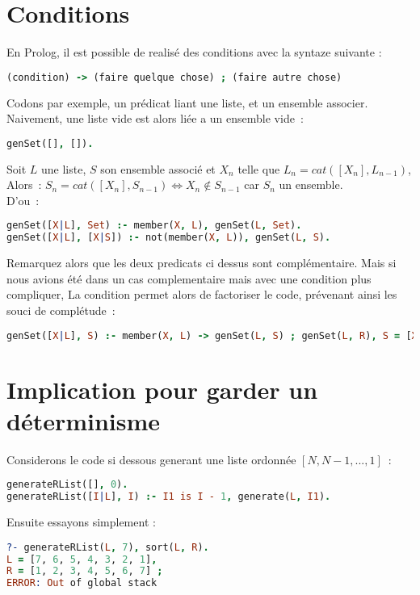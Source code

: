 \section{Conditions}
En Prolog, il est possible de realisé des conditions avec la syntaze suivante :
\begin{lstlisting}[language=Prolog,frame=single]
(condition) -> (faire quelque chose) ; (faire autre chose)
\end{lstlisting}

Codons par exemple, un prédicat liant une liste, et un ensemble associer.
Naivement, une liste vide est alors liée a un ensemble vide~:
\begin{lstlisting}[language=Prolog,frame=single]
genSet([], []).
\end{lstlisting}

Soit $L$ une liste, $S$ son ensemble associé et $X_n$ telle que $L_{n} = cat([X_n], L_{n-1})$,\\
Alors~: $S_{n} = cat([X_n], S_{n-1}) \Leftrightarrow X_n \notin S_{n-1}$ car $S_{n}$ un ensemble.\\
D'ou~:
\begin{lstlisting}[language=Prolog,frame=single]
genSet([X|L], Set) :- member(X, L), genSet(L, Set).
genSet([X|L], [X|S]) :- not(member(X, L)), genSet(L, S).
\end{lstlisting}

Remarquez alors que les deux predicats ci dessus sont complémentaire. Mais si nous avions
été dans un cas complementaire mais avec une condition plus compliquer, La condition
permet alors de factoriser le code, prévenant ainsi les souci de complétude~:
\begin{lstlisting}[language=Prolog,frame=single]
genSet([X|L], S) :- member(X, L) -> genSet(L, S) ; genSet(L, R), S = [X|R].
\end{lstlisting}

\section{Implication pour garder un déterminisme}
Considerons le code si dessous generant une liste ordonnée $[N, N-1, ..., 1]$~:
\begin{lstlisting}[language=Prolog,frame=single]
generateRList([], 0).
generateRList([I|L], I) :- I1 is I - 1, generate(L, I1).
\end{lstlisting}

Ensuite essayons simplement :
\begin{lstlisting}[language=Prolog,frame=single]
?- generateRList(L, 7), sort(L, R).
L = [7, 6, 5, 4, 3, 2, 1],
R = [1, 2, 3, 4, 5, 6, 7] ;
ERROR: Out of global stack
\end{lstlisting}


